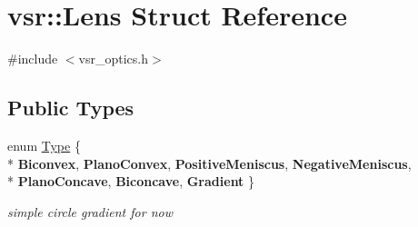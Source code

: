 \hypertarget{structvsr_1_1_lens}{\section{vsr\-:\-:Lens Struct Reference}
\label{structvsr_1_1_lens}
}


{\ttfamily \#include $<$vsr\-\_\-optics.\-h$>$}

\subsection*{Public Types}
\begin{DoxyCompactItemize}
\item 
enum \hyperlink{structvsr_1_1_lens_a1f4790f546826245cbcd28827a9cf391}{Type} \{ \\*
{\bfseries Biconvex}, 
{\bfseries Plano\-Convex}, 
{\bfseries Positive\-Meniscus}, 
{\bfseries Negative\-Meniscus}, 
\\*
{\bfseries Plano\-Concave}, 
{\bfseries Biconcave}, 
{\bfseries Gradient}
 \}
\begin{DoxyCompactList}\small\item\em simple circle gradient for now \end{DoxyCompactList}\end{DoxyCompactItemize}
